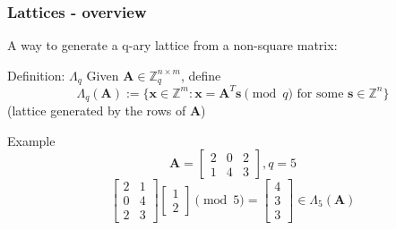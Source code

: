 \documentclass{beamer}
\renewcommand{\v}{\mathbf}
\begin{document}
\begin{frame}
\frametitle{Lattices - overview}
A way to generate a q-ary lattice from a non-square matrix:
\begin{block}{Definition: $\Lambda_q$}
Given $\v{A} \in \mathbb{Z}_q^{n \times m}$, define
\begin{equation*}
    \Lambda_q(\v{A}) := \{\v{x} \in \mathbb{Z}^m: \v{x} = \v{A}^T\v{s}
        \pmod{q} \text{ for some } \v{s} \in \mathbb{Z}^n
    \}
\end{equation*}
(lattice generated by the rows of $\v{A}$)
\end{block}
\begin{block}{Example}
\begin{equation*}
    \v{A} = \begin{bmatrix} 2 & 0 & 2 \\ 1 & 4 & 3 \end{bmatrix}, q=5
\end{equation*}
\begin{equation*}
    \begin{bmatrix}2 & 1 \\ 0 & 4 \\ 2 & 3\end{bmatrix}
    \begin{bmatrix}1 \\ 2 \end{bmatrix} \pmod{5} =
    \begin{bmatrix}4 \\ 3 \\ 3\end{bmatrix} \in \Lambda_5(\v{A})
\end{equation*}
\end{block}
\end{frame}
\end{document}
